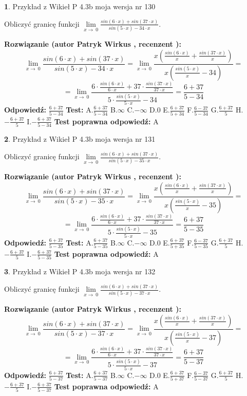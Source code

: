 \documentclass[12pt, a4paper]{article}
\theoremstyle{definition} %
\newtheorem{zad}{}
\newcommand{\zadStart}[1]{\begin{zad}#1\newline}
\newcommand{\zadStop}{\end{zad}}
\newcommand{\rozwStart}[2]{\noindent \textbf{Rozwiązanie (autor #1 , recenzent #2): }\newline}
\newcommand{\rozwStop}{\newline}
\newcommand{\odpStart}{\noindent \textbf{Odpowiedź:}\newline}
\newcommand{\odpStop}{\newline}
\newcommand{\testStart}{\noindent \textbf{Test:}\newline}
\newcommand{\testStop}{\newline}
\newcommand{\kluczStart}{\noindent \textbf{Test poprawna odpowiedź:}\newline}
\newcommand{\kluczStop}{\newline}
\begin{document}
\zadStart{Przykład z Wikieł P 4.3b moja wersja nr 130}


Obliczyć granicę funkcji $\lim\limits_{x\to\ 0}\frac{sin(6 \cdot x)+sin(37 \cdot x)}{sin(5 \cdot x)-34 \cdot x}$.
\zadStop
\rozwStart{Patryk Wirkus}{}
$$\lim\limits_{x\to\ 0}\frac{sin(6 \cdot x)+sin(37 \cdot x)}{sin(5 \cdot x)-34 \cdot x}=\lim\limits_{x\to\ 0}\frac{x(\frac{sin(6 \cdot x)}{x}+\frac{sin(37 \cdot x)}{x})}{x(\frac{sin(5 \cdot x)}{x}-34)}=$$
$$=\lim\limits_{x\to\ 0}\frac{6 \cdot \frac{sin(6 \cdot x)}{6 \cdot x}+37 \cdot \frac{sin(37 \cdot x)}{37 \cdot x}}{5 \cdot \frac{sin(5 \cdot x)}{5 \cdot x}-34}=\frac{6+37}{5-34}$$
\rozwStop
\odpStart
$\frac{6+37}{5-34}$
\odpStop
\testStart
A.$\frac{6+37}{5-34}$
B.$\infty$
C.$-\infty$
D.$0$
E.$\frac{6+37}{5+34}$
F.$\frac{6-37}{5-34}$
G.$\frac{6+37}{5}$
H.$-\frac{6+37}{5}$
I.$-\frac{6+37}{5-34}$
\testStop
\kluczStart
A
\kluczStop



\zadStart{Przykład z Wikieł P 4.3b moja wersja nr 131}


Obliczyć granicę funkcji $\lim\limits_{x\to\ 0}\frac{sin(6 \cdot x)+sin(37 \cdot x)}{sin(5 \cdot x)-35 \cdot x}$.
\zadStop
\rozwStart{Patryk Wirkus}{}
$$\lim\limits_{x\to\ 0}\frac{sin(6 \cdot x)+sin(37 \cdot x)}{sin(5 \cdot x)-35 \cdot x}=\lim\limits_{x\to\ 0}\frac{x(\frac{sin(6 \cdot x)}{x}+\frac{sin(37 \cdot x)}{x})}{x(\frac{sin(5 \cdot x)}{x}-35)}=$$
$$=\lim\limits_{x\to\ 0}\frac{6 \cdot \frac{sin(6 \cdot x)}{6 \cdot x}+37 \cdot \frac{sin(37 \cdot x)}{37 \cdot x}}{5 \cdot \frac{sin(5 \cdot x)}{5 \cdot x}-35}=\frac{6+37}{5-35}$$
\rozwStop
\odpStart
$\frac{6+37}{5-35}$
\odpStop
\testStart
A.$\frac{6+37}{5-35}$
B.$\infty$
C.$-\infty$
D.$0$
E.$\frac{6+37}{5+35}$
F.$\frac{6-37}{5-35}$
G.$\frac{6+37}{5}$
H.$-\frac{6+37}{5}$
I.$-\frac{6+37}{5-35}$
\testStop
\kluczStart
A
\kluczStop



\zadStart{Przykład z Wikieł P 4.3b moja wersja nr 132}


Obliczyć granicę funkcji $\lim\limits_{x\to\ 0}\frac{sin(6 \cdot x)+sin(37 \cdot x)}{sin(5 \cdot x)-37 \cdot x}$.
\zadStop
\rozwStart{Patryk Wirkus}{}
$$\lim\limits_{x\to\ 0}\frac{sin(6 \cdot x)+sin(37 \cdot x)}{sin(5 \cdot x)-37 \cdot x}=\lim\limits_{x\to\ 0}\frac{x(\frac{sin(6 \cdot x)}{x}+\frac{sin(37 \cdot x)}{x})}{x(\frac{sin(5 \cdot x)}{x}-37)}=$$
$$=\lim\limits_{x\to\ 0}\frac{6 \cdot \frac{sin(6 \cdot x)}{6 \cdot x}+37 \cdot \frac{sin(37 \cdot x)}{37 \cdot x}}{5 \cdot \frac{sin(5 \cdot x)}{5 \cdot x}-37}=\frac{6+37}{5-37}$$
\rozwStop
\odpStart
$\frac{6+37}{5-37}$
\odpStop
\testStart
A.$\frac{6+37}{5-37}$
B.$\infty$
C.$-\infty$
D.$0$
E.$\frac{6+37}{5+37}$
F.$\frac{6-37}{5-37}$
G.$\frac{6+37}{5}$
H.$-\frac{6+37}{5}$
I.$-\frac{6+37}{5-37}$
\testStop
\kluczStart
A
\kluczStop
\end{document}
